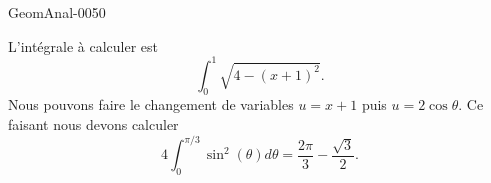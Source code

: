\begin{corrige}{GeomAnal-0050}

    L'intégrale à calculer est
    \begin{equation}
        \int_0^1\sqrt{4-(x+1)^2}.
    \end{equation}
    Nous pouvons faire le changement de variables \( u=x+1\) puis \( u=2\cos\theta\). Ce faisant nous devons calculer
    \begin{equation}
        4\int_0^{\pi/3}\sin^2(\theta)d\theta=\frac{ 2\pi }{ 3 }-\frac{ \sqrt{3} }{2}.
    \end{equation}

\end{corrige}
